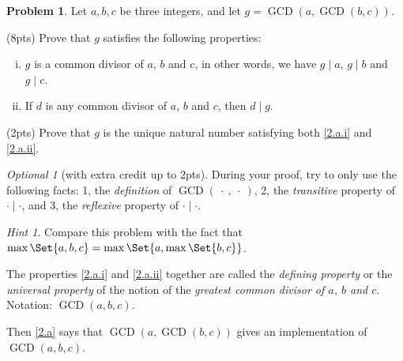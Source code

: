 \documentclass[11pt]{article}
\theoremstyle{plain}
\theoremstyle{definition}
\newtheorem{problem}{Problem}
\theoremstyle{remark}
\newtheorem*{hint}{Hint}
\newtheorem*{optional}{Optional}
\numberwithin{equation}{problem}
\DeclareMathOperator*\GCD{GCD}
\begin{document}
\begin{problem}\label{p2}
	Let $a, b, c$ be three integers, and let $g=\GCD(a,\GCD(b,c))$. 
	\begin{listinprob}
		\item\label{2.a} (8pts) Prove that $g$ satisfies the following properties: 
		\begin{enumerate}[(i)]
			\item\label{2.a.i} $g$ is a common divisor of $a$, $b$ and $c$, in other words, we have $g\mid a$, $g\mid b$ and $g\mid c$. 
			\item\label{2.a.ii} If $d$ is any common divisor of $a$, $b$ and $c$, then $d\mid g$.
		\end{enumerate}
		\item\label{2.b} (2pts) 
		Prove that $g$ is the unique natural number satisfying both \ref{2.a.i} and \ref{2.a.ii}.
	\end{listinprob}
	\begin{optional}[with extra credit up to 2pts]
		During your proof, try to only use the following facts: 1, the \emph{definition} of $\GCD(\:\cdot\:,\:\cdot\:)$, 2, the \emph{transitive} property of $\cdot\mid\cdot$, and 3, the \emph{reflexive} property of $\cdot\mid\cdot$. 
	\end{optional}
	\begin{hint}
		Compare this problem with the fact that $\max\Set{a,b,c} = \max\Set{a,\max\Set{b,c}}$.
	\end{hint}

	The properties \ref{2.a.i} and \ref{2.a.ii} together are called the \emph{defining property} or the \emph{universal property} of the notion of the \emph{greatest common divisor of $a$, $b$ and $c$}. Notation: $\GCD(a, b, c)$.
	
	Then \cref{2.a} says that $\GCD(a,\GCD(b, c))$ gives an implementation of $\GCD(a, b, c)$.
\end{problem}
\end{document}
